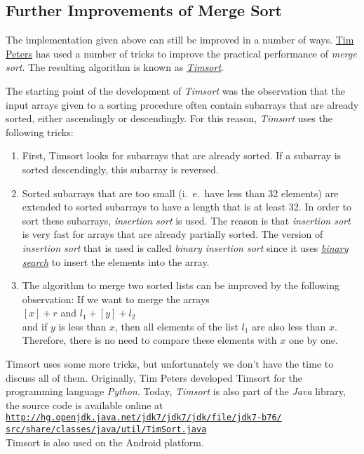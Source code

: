 \subsection{Further Improvements of Merge Sort}
The implementation given above can still be improved in a number of ways.  
\href{http://c2.com/cgi/wiki?TimPeters}{Tim Peters} has used a number of tricks to improve the
practical performance of \emph{merge sort}.  The resulting algorithm is known as
\href{http://en.wikipedia.org/wiki/Timsort}{\emph{Timsort}}.

The starting point of the development of \emph{Timsort} was the observation that the input arrays 
given to a sorting procedure often contain subarrays that are already sorted, either ascendingly or
descendingly.   For this reason, \emph{Timsort} uses the following tricks:
\begin{enumerate}
\item First, Timsort looks for subarrays that are already sorted.
      If a subarray is sorted descendingly, this subarray is reversed.
\item Sorted subarrays that are too small (i.~e.~have less than 32 elements) are extended
      to sorted subarrays to have a length that is at least 32.  In order to sort these subarrays,
      \emph{insertion sort} is used.  The reason is that \emph{insertion sort} is very fast for
      arrays that are already partially sorted.  The version of \emph{insertion sort} that is used is called
      \emph{binary insertion sort} since it uses 
      \href{http://en.wikipedia.org/wiki/Binary_search}{\emph{binary search}} to insert the elements
      into the array.
\item The algorithm to merge two sorted lists can be improved by the following observation: If we
      want to merge the arrays
      \\[0.2cm]
      \hspace*{1.3cm}
      $[x] + r$ \quad and \quad $l_1 + [y] + l_2$
      \\[0.2cm]
      and if $y$ is less than $x$, then all elements of the list $l_1$ are also less than $x$.
      Therefore, there is no need to compare these elements with $x$ one by one.  
\end{enumerate}
Timsort uses some more tricks, but unfortunately we don't have the time to discuss all of them.
Originally, Tim Peters developed Timsort for the programming language \textsl{Python}.  Today,
\emph{Timsort} is also part of the \textsl{Java} library, the source code is available online at
\\[0.2cm]
\hspace*{1.3cm}
\href{http://hg.openjdk.java.net/jdk7/jdk7/jdk/file/jdk7-b76/src/share/classes/java/util/TimSort.java}{\texttt{http://hg.openjdk.java.net/jdk7/jdk7/jdk/file/jdk7-b76/\\
\hspace*{2.5cm}
    src/share/classes/java/util/TimSort.java}}
\\[0.2cm]
Timsort is also used on the Android platform.

